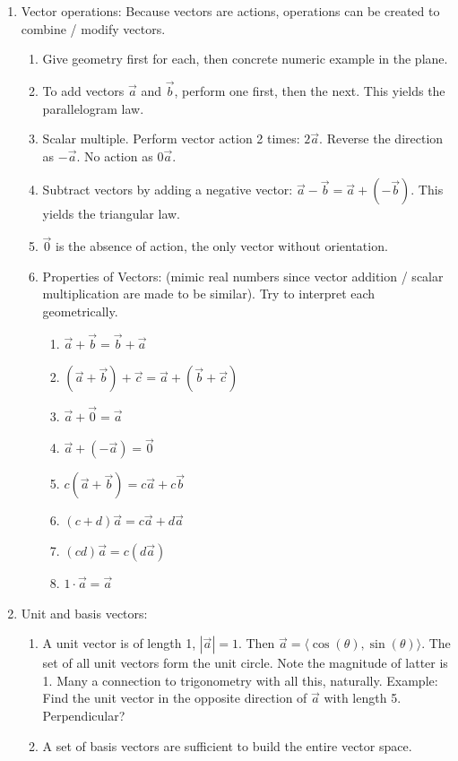 \documentclass{article}
\begin{document}
\begin{enumerate}
\item Vector operations: Because vectors are actions, operations can be created to combine / modify vectors.
\begin{enumerate}
\item Give geometry first for each, then concrete numeric example in the plane.
\item To add vectors $\vec{a}$ and $\vec{b}$, perform one first, then the next. This yields the parallelogram law. 
\item Scalar multiple. Perform vector action 2 times: $2\vec{a}$. Reverse the direction as $-\vec{a}$. No action as $0\vec{a}$.
\item Subtract vectors by adding a negative vector: $\vec{a}-\vec{b} = \vec{a} + (-\vec{b})$. This yields the triangular law. 
\item $\vec{0}$ is the absence of action, the only vector without orientation.
\item Properties of Vectors: (mimic real numbers since vector addition / scalar multiplication are made to be similar). Try to interpret each geometrically.
\begin{enumerate}
\item $\vec a+\vec b = \vec b+\vec a$
\item $(\vec a+\vec b)+\vec c =\vec a+( \vec b+\vec c)$
\item $\vec a+\vec 0 = \vec a$
\item $\vec a+(-\vec a)  = \vec 0$
\item $c(\vec a+\vec b) = c\vec a+c\vec b$
\item $(c+d)\vec a = c\vec a+d\vec a$
\item $(cd)\vec a = c(d\vec a)$
\item $1\cdot \vec a = \vec a$
\end{enumerate}
\end{enumerate}

\item Unit and basis vectors:
\begin{enumerate}
\item A unit vector is of length 1, $|\vec{a}| = 1$. Then $\vec{a} = \langle \cos(\theta), \sin(\theta)\rangle $. The set of all unit vectors form the unit circle. Note the magnitude of latter is 1. Many a connection to trigonometry with all this, naturally. Example: Find the unit vector in the opposite direction of $\vec{a}$ with length 5. Perpendicular?
\item A set of basis vectors are sufficient to build the entire vector space.
\end{enumerate}



\end{enumerate}
\end{document}
